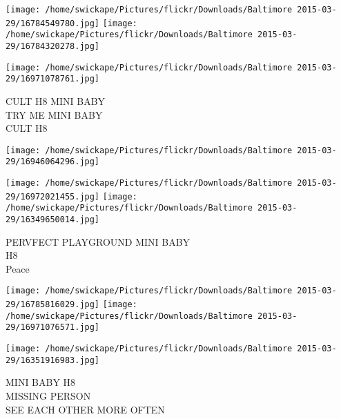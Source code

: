 \documentclass[10pt,letterpaper]{article}
\begin{document}
\texttt{[image: /home/swickape/Pictures/flickr/Downloads/Baltimore 2015-03-29/16784549780.jpg]}
\texttt{[image: /home/swickape/Pictures/flickr/Downloads/Baltimore 2015-03-29/16784320278.jpg]}

\texttt{[image: /home/swickape/Pictures/flickr/Downloads/Baltimore 2015-03-29/16971078761.jpg]}

CULT H8 MINI BABY\\
TRY ME MINI BABY\\
CULT H8
\pagebreak

\texttt{[image: /home/swickape/Pictures/flickr/Downloads/Baltimore 2015-03-29/16946064296.jpg]}

\vspace{0.25in}
\texttt{[image: /home/swickape/Pictures/flickr/Downloads/Baltimore 2015-03-29/16972021455.jpg]}
\texttt{[image: /home/swickape/Pictures/flickr/Downloads/Baltimore 2015-03-29/16349650014.jpg]}

PERVFECT PLAYGROUND MINI BABY\\
H8\\
Peace
\pagebreak

\texttt{[image: /home/swickape/Pictures/flickr/Downloads/Baltimore 2015-03-29/16785816029.jpg]}
\texttt{[image: /home/swickape/Pictures/flickr/Downloads/Baltimore 2015-03-29/16971076571.jpg]}

\vspace{0.25in}
\texttt{[image: /home/swickape/Pictures/flickr/Downloads/Baltimore 2015-03-29/16351916983.jpg]}

MINI BABY H8\\
MISSING PERSON\\
SEE EACH OTHER MORE OFTEN
\pagebreak
\end{document}
